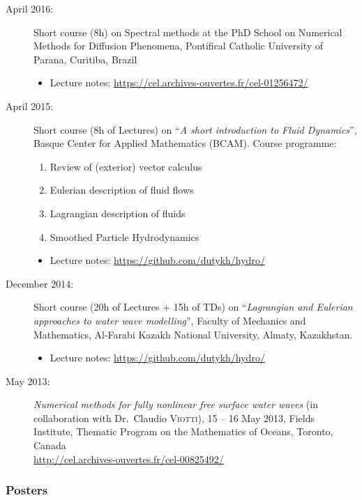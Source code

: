 \documentclass[final, a4paper, oneside, 12pt]{article}
\numberwithin{equation}{section}
\begin{document}
\begin{description}

  \item[April 2016:] Short course (8h) on Spectral methods at the PhD School on Numerical Methods for Diffusion Phenomena, Pontifical Catholic University of Parana, Curitiba, Brazil
  \begin{itemize}
    \item Lecture notes: \url{https://cel.archives-ouvertes.fr/cel-01256472/}
  \end{itemize}

  \item[April 2015:] Short course (8h of Lectures) on ``\textit{A short introduction to Fluid Dynamics}'', Basque Center for Applied Mathematics (BCAM). Course programme:
  \begin{enumerate}
    \item Review of (exterior) vector calculus
    \item Eulerian description of fluid flows
    \item Lagrangian description of fluids
    \item Smoothed Particle Hydrodynamics
  \end{enumerate}
  \begin{itemize}
    \item Lecture notes: \url{https://github.com/dutykh/hydro/}
  \end{itemize}

  \item[December 2014:] Short course (20h of Lectures + 15h of TDs) on ``\textit{Lagrangian and Eulerian approaches to water wave modelling}'', Faculty of Mechanics and Mathematics, Al-Farabi Kazakh National University, Almaty, Kazakhstan.
  \begin{itemize}
    \item Lecture notes: \url{https://github.com/dutykh/hydro/}
  \end{itemize}

  \item[May 2013:] \textit{Numerical methods for fully nonlinear free surface water waves} (in collaboration with Dr.~Claudio \textsc{Viotti}), 15 -- 16 May 2013, Fields Institute, Thematic Program on the Mathematics of Oceans, Toronto, Canada \\
  \url{http://cel.archives-ouvertes.fr/cel-00825492/}
  
\end{description}

\subsubsection{Posters}
\end{document}

